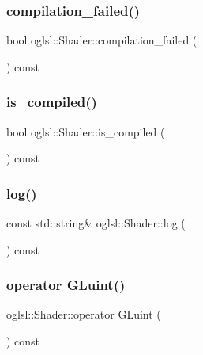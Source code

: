 \subsubsection{\texorpdfstring{compilation\+\_\+failed()}{compilation\_failed()}}
{\footnotesize\ttfamily bool oglsl\+::\+Shader\+::compilation\+\_\+failed (\begin{DoxyParamCaption}{ }\end{DoxyParamCaption}) const\hspace{0.3cm}{\ttfamily [inline]}}

\mbox{\label{classoglsl_1_1_shader_ade2f39e7d78cf5ac226fbe05b136b1c9}} 
\subsubsection{\texorpdfstring{is\+\_\+compiled()}{is\_compiled()}}
{\footnotesize\ttfamily bool oglsl\+::\+Shader\+::is\+\_\+compiled (\begin{DoxyParamCaption}{ }\end{DoxyParamCaption}) const\hspace{0.3cm}{\ttfamily [inline]}}

\mbox{\label{classoglsl_1_1_shader_a5556801b4f5dffa82d3835003a73184a}} 
\subsubsection{\texorpdfstring{log()}{log()}}
{\footnotesize\ttfamily const std\+::string\& oglsl\+::\+Shader\+::log (\begin{DoxyParamCaption}{ }\end{DoxyParamCaption}) const\hspace{0.3cm}{\ttfamily [inline]}}

\mbox{\label{classoglsl_1_1_shader_af1bd8a3a30dff0e4f1c0e110db845169}} 
\subsubsection{\texorpdfstring{operator G\+Luint()}{operator GLuint()}}
{\footnotesize\ttfamily oglsl\+::\+Shader\+::operator G\+Luint (\begin{DoxyParamCaption}{ }\end{DoxyParamCaption}) const\hspace{0.3cm}{\ttfamily [inline]}}



